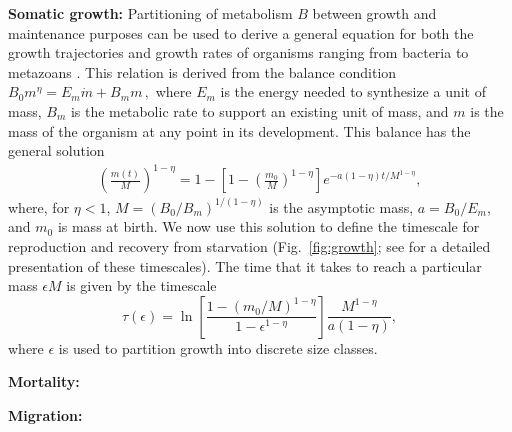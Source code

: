 \documentclass[twocolumn,preprintnumbers,amsmath,amssymb,superscriptaddress]{revtex4}
\begin{document}
\noindent \textbf{Somatic growth:}
Partitioning of metabolism $B$ between growth and maintenance purposes can be used to derive a general equation for both the
growth trajectories and growth rates of organisms ranging from bacteria to
metazoans
\citep{West:2001bv,moses2008rmo,gillooly2002esa,hou,Kempes:2012hy}. 
This relation is derived from the balance condition 
$B_{0}m^{\eta}=E_{m}\dot{m}+B_{m}m\,,$
\citep{West:2001bv,moses2008rmo,gillooly2002esa,hou,Kempes:2012hy} where $E_{m}$ is the energy needed to synthesize a unit of mass, $B_{m}$ is the metabolic rate to support an existing unit of mass, and $m$ is the mass of the organism at any point in its development.  
This balance has the general solution \citep{bettencourt,Kempes:2012hy}
\begin{eqnarray}
\label{m1}
\left(\frac{m\left(t\right)}{M}\right)^{1-\eta}\!=1\!-\!\left[1\!-\!\left(\frac{m_{0}}{M}\right)^{1\!-\!\eta}\right]e^{-a\left(1\!-\!\eta\right)t/M^{1-\eta}},
\end{eqnarray}
where, for $\eta<1$, $M=(B_{0}/B_{m})^{1/(1-\eta)}$ is the asymptotic mass, $a=B_{0}/E_{m}$, and $m_0$ is mass at birth.  
We now use this solution to define the timescale for reproduction and recovery from starvation (Fig.~\ref{fig:growth}; see \citep{moses2008rmo} for a detailed presentation of these timescales). 
The time that it takes to reach a particular mass $\epsilon M$ is given by the timescale
\begin{equation}
\label{t1}
\tau\left(\epsilon\right) = \ln\left[\frac{1-\left(m_{0}/M\right)^{1-\eta}}{1-\epsilon^{1-\eta}}\right]\frac{M^{1-\eta}}{a\left(1-\eta\right)},
\end{equation}
where $\epsilon$ is used to partition growth into discrete size classes. 

% 

\noindent \textbf{Mortality:}


\noindent \textbf{Migration:}


\end{document}
